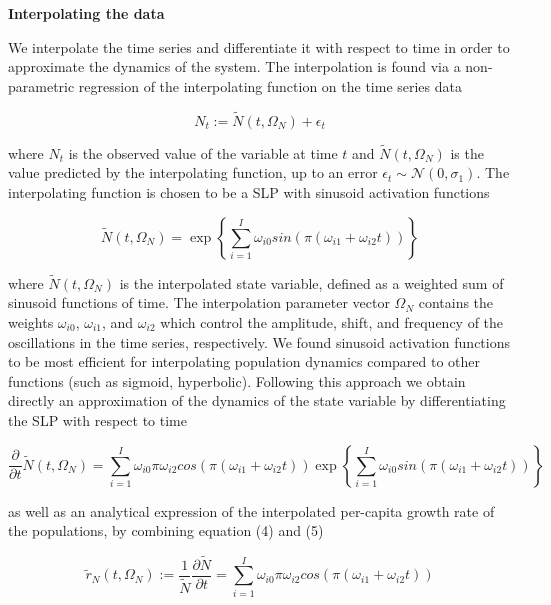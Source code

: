 \documentclass[11pt, oneside]{article}
\begin{document}
\textbf{Interpolating the data}

We interpolate the time series and differentiate it with respect to time in order to approximate the dynamics of the system.
The interpolation is found via a non-parametric regression of the interpolating function on the time series data

\begin{equation}
	N_t := \tilde{N}(t,\Omega_N) + \epsilon_t
\end{equation}

where $N_t$ is the observed value of the variable at time $t$ and $\tilde{N}(t,\Omega_N)$ is the value predicted by the interpolating function, up to an error $\epsilon_t \sim \mathcal{N}(0,\sigma_1)$. 
The interpolating function is chosen to be a SLP with sinusoid activation functions

\begin{equation}
    \tilde{N}(t,\Omega_N) = \exp \left \{ \sum_{i=1}^{I} \omega_{i0} sin \left(\pi (\omega_{i1} + \omega_{i2} t) \right) \right \}
\end{equation}

where $\tilde{N}(t,\Omega_N)$ is the interpolated state variable, defined as a weighted sum of sinusoid functions of time.
The interpolation parameter vector $\Omega_N$ contains the weights $\omega_{i0}$, $\omega_{i1}$, and $\omega_{i2}$ which control the amplitude, shift, and frequency of the oscillations in the time series, respectively.
We found sinusoid activation functions to be most efficient for interpolating population dynamics compared to other functions (such as sigmoid, hyperbolic).
Following this approach we obtain directly an approximation of the dynamics of the state variable by differentiating the SLP with respect to time

\begin{equation}
	\frac{\partial}{\partial t} \tilde{N}(t, \Omega_N) = \sum_{i=1}^{I} \omega_{i0} \pi \omega_{i2} cos \left(\pi (\omega_{i1} + \omega_{i2} t) \right) \exp \left \{ \sum_{i=1}^{I} \omega_{i0} sin \left(\pi (\omega_{i1} + \omega_{i2} t) \right) \right \}
\end{equation}

as well as an analytical expression of the interpolated per-capita growth rate of the populations, by combining equation (4) and (5)

\begin{equation}
    \tilde{r}_N (t,\Omega_N) := \frac{1}{\tilde{N}} \frac{\partial \tilde{N}}{\partial t} = \sum_{i=1}^{I} \omega_{i0} \pi \omega_{i2} cos \left(\pi (\omega_{i1} + \omega_{i2} t) \right)
\end{equation}
\end{document}
